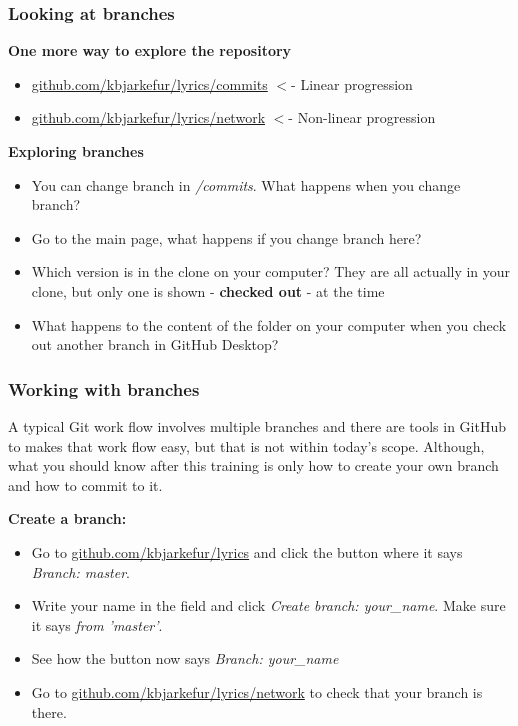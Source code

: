 \documentclass[aspectratio=169]{beamer} %
\newcommand{\trainingURL}[1]{{\color{blue}\url{#1}}}
\newcommand{\traininerUsername}{kbjarkefur}
\newcommand{\repoName}{\traininerUsername/lyrics}
\newcommand{\trainingRepoURL}[1]{\trainingURL{github.com/\repoName #1}}
\begin{document}
\begin{frame}
\frametitle{Looking at branches}


	\textbf{One more way to explore the repository}
	\begin{itemize}
		\item \trainingRepoURL{/commits} $<$- Linear progression
		\item \trainingRepoURL{/network} $<$- Non-linear progression
	\end{itemize}

	\vspace{.1cm}
	
	\textbf{Exploring branches}
	\begin{itemize}
		\item You can change branch in \textit{/commits}. What happens when you change branch?
		\item Go to the main page, what happens if you change branch here?
		\item Which version is in the clone on your computer? They are all actually in your clone, but only one is shown - \textbf{checked out} - at the time
		\item What happens to the content of the folder on your computer when you check out another branch in GitHub Desktop?
	\end{itemize}

\end{frame}

\begin{frame}
\frametitle{Working with branches}

	A typical Git work flow involves multiple branches and there are tools in GitHub to makes that work flow easy, but that is not within today's scope. Although, what you should know after this training is only how to create your own branch and how to commit to it. 
	
	\textbf{Create a branch:}
	\begin{itemize}
		\item Go to \trainingRepoURL{} and click the button where it says \textit{Branch: master}.
		\item Write your name in the field and click \textit{Create branch: your\_name}. Make sure it says \textit{from 'master'}.
		\item See how the button now says \textit{Branch: your\_name}
		\item Go to \trainingRepoURL{/network} to check that your branch is there.
	\end{itemize}	

\end{frame}
\end{document}
